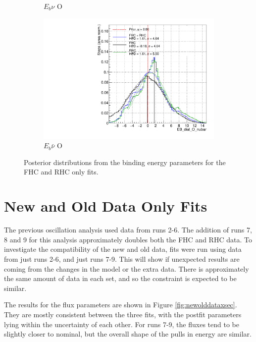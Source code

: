 \begin{figure}
\begin{subfigure}{.48\textwidth}
  \caption{$E_{b}\nu$ O}
\end{subfigure}
\begin{subfigure}{.48\textwidth}
  \centering
  \includegraphics[width=0.73\linewidth]{figs/FHCRHC_EB_dial_O_nubar}
  \caption{$E_{b}\bar{\nu}$ O}
\end{subfigure}
\caption{Posterior distributions from the binding energy parameters for the FHC and RHC only fits.}
\label{fig:FHCRHCEbdata}
\end{figure}

\section{New and Old Data Only Fits}

The previous oscillation analysis\cite{PhysRevLett.121.171802} used data from runs 2-6. The addition of runs 7, 8 and 9 for this analysis approximately doubles both the FHC and RHC data. To investigate the compatibility of the new and old data, fits were run using data from just runs 2-6, and just runs 7-9. This will show if unexpected results are coming from the changes in the model or the extra data. There is approximately the same amount of data in each set, and so the constraint is expected to be similar.

The results for the flux parameters are shown in Figure \ref{fig:newolddataxsec}. They are mostly consistent between the three fits, with the postfit parameters lying within the uncertainty of each other. For runs 7-9, the fluxes tend to be slightly closer to nominal, but the overall shape of the pulls in energy are similar.

